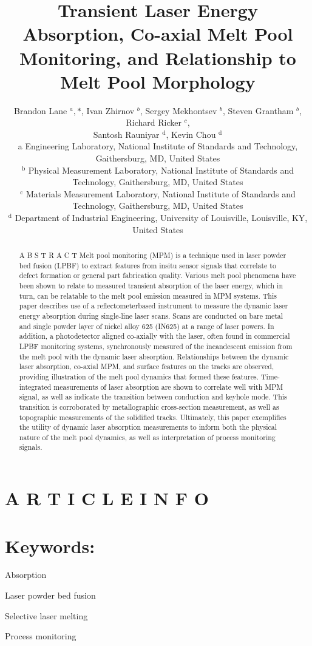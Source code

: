 \documentclass[10pt]{article}
\title{Transient Laser Energy Absorption, Co-axial Melt Pool Monitoring, and Relationship to Melt Pool Morphology }
\author{Brandon Lane ${ }^{a}, *$, Ivan Zhirnov ${ }^{b}$, Sergey Mekhontsev ${ }^{b}$, Steven Grantham ${ }^{b}$, Richard Ricker ${ }^{c}$,\\
Santosh Rauniyar ${ }^{\mathrm{d}}$, Kevin Chou ${ }^{\mathrm{d}}$\\
a Engineering Laboratory, National Institute of Standards and Technology, Gaithersburg, MD, United States\\
${ }^{\mathrm{b}}$ Physical Measurement Laboratory, National Institute of Standards and Technology, Gaithersburg, MD, United States\\
${ }^{\mathrm{c}}$ Materials Measurement Laboratory, National Institute of Standards and Technology, Gaithersburg, MD, United States\\
${ }^{\mathrm{d}}$ Department of Industrial Engineering, University of Louisville, Louisville, KY, United States}
\date{}
\begin{document}
\maketitle


\section*{A R T I C L E I N F O}
\section*{Keywords:}
Absorption

Laser powder bed fusion

Selective laser melting

Process monitoring

\begin{abstract}
A B S T R A C T Melt pool monitoring (MPM) is a technique used in laser powder bed fusion (LPBF) to extract features from insitu sensor signals that correlate to defect formation or general part fabrication quality. Various melt pool phenomena have been shown to relate to measured transient absorption of the laser energy, which in turn, can be relatable to the melt pool emission measured in MPM systems. This paper describes use of a reflectometerbased instrument to measure the dynamic laser energy absorption during single-line laser scans. Scans are conducted on bare metal and single powder layer of nickel alloy 625 (IN625) at a range of laser powers. In addition, a photodetector aligned co-axially with the laser, often found in commercial LPBF monitoring systems, synchronously measured of the incandescent emission from the melt pool with the dynamic laser absorption. Relationships between the dynamic laser absorption, co-axial MPM, and surface features on the tracks are observed, providing illustration of the melt pool dynamics that formed these features. Time-integrated measurements of laser absorption are shown to correlate well with MPM signal, as well as indicate the transition between conduction and keyhole mode. This transition is corroborated by metallographic cross-section measurement, as well as topographic measurements of the solidified tracks. Ultimately, this paper exemplifies the utility of dynamic laser absorption measurements to inform both the physical nature of the melt pool dynamics, as well as interpretation of process monitoring signals.
\end{abstract}
\end{document}
